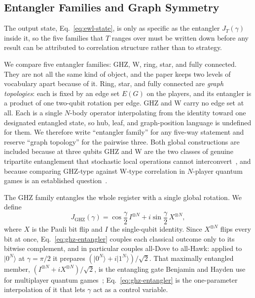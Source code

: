 \documentclass[conference,letterpaper,10pt]{IEEEtran}
\newcommand{\ket}[1]{\ensuremath{|#1\rangle}}
\begin{document}
\subsection{Entangler Families and Graph Symmetry}
\label{sec:families}
The output state, Eq.~\eqref{eq:ewl-state}, is only as specific as the entangler
$J_T(\gamma)$ inside it, so the five families that $T$ ranges over must be
written down before any result can be attributed to correlation structure rather
than to strategy.

We compare five entangler families: GHZ, W, ring, star, and fully connected.
They are not all the same kind of object, and the paper keeps two levels of
vocabulary apart because of it. Ring, star, and fully connected are \emph{graph
topologies}: each
is fixed by an edge set $E(G)$ on the players, and its entangler is a product of
one two-qubit rotation per edge. GHZ and W carry no edge set at all. Each is a
single $N$-body operator interpolating from the identity toward one designated
entangled state, so hub, leaf, and graph-position language is undefined for
them. We therefore write ``entangler family'' for any five-way statement and
reserve ``graph topology'' for the pairwise three. Both global constructions are
included because at three qubits GHZ and W are the two classes of genuine
tripartite entanglement that stochastic local operations cannot
interconvert~\cite{duer2000three}, and because comparing GHZ-type against
W-type correlation in $N$-player quantum games is an established
question~\cite{chappell2012}.

The GHZ family entangles the whole register with a single global rotation. We
define
\begin{equation}
J_{\mathrm{GHZ}}(\gamma)
=\cos\frac{\gamma}{2}\,I^{\otimes N}
+i\sin\frac{\gamma}{2}\,X^{\otimes N},
\label{eq:ghz-entangler}
\end{equation}
where $X$ is the Pauli bit flip and $I$ the single-qubit identity. Since
$X^{\otimes N}$ flips every bit at once, Eq.~\eqref{eq:ghz-entangler} couples
each classical outcome only to its bitwise complement, and in particular couples
all-Dove to all-Hawk: applied to $\ket{0^N}$ at $\gamma=\pi/2$ it prepares
$(\ket{0^N}+i\ket{1^N})/\sqrt{2}$. That maximally entangled member,
$(I^{\otimes N}+iX^{\otimes N})/\sqrt{2}$, is the entangling gate Benjamin and
Hayden use for multiplayer quantum games~\cite{benjamin2001};
Eq.~\eqref{eq:ghz-entangler} is the one-parameter interpolation of it that lets
$\gamma$ act as a control variable.
\end{document}
